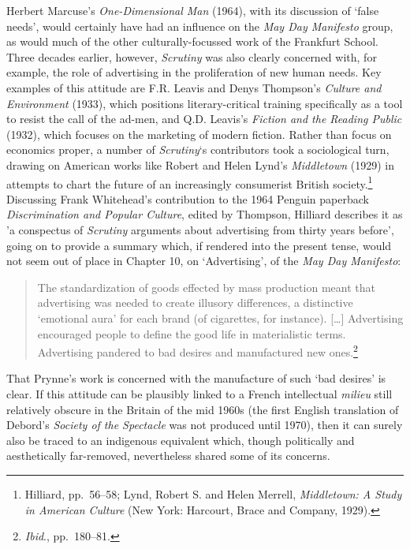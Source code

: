 \documentclass[]{article}
\begin{document}
Herbert Marcuse’s \emph{One-Dimensional Man} (1964), with its discussion
of ‘false needs’, would certainly have had an influence on the \emph{May
Day Manifesto} group, as would much of the other culturally-focussed
work of the Frankfurt School. Three decades earlier, however,
\emph{Scrutiny} was also clearly concerned with, for example, the role
of advertising in the proliferation of new human needs. Key examples of
this attitude are F.R. Leavis and Denys Thompson’s \emph{Culture and
Environment} (1933), which positions literary-critical training
specifically as a tool to resist the call of the ad-men, and Q.D.
Leavis’s \emph{Fiction and the Reading Public} (1932), which focuses on
the marketing of modern fiction. Rather than focus on economics proper,
a number of \emph{Scrutiny}‘s contributors took a sociological turn,
drawing on American works like Robert and Helen Lynd’s \emph{Middletown}
(1929) in attempts to chart the future of an increasingly consumerist
British society.\footnote{Hilliard, pp.~56–58; Lynd, Robert S. and Helen
  Merrell, \emph{Middletown: A Study in American Culture} (New York:
  Harcourt, Brace and Company, 1929).} Discussing Frank Whitehead’s
contribution to the 1964 Penguin paperback \emph{Discrimination and
Popular Culture}, edited by Thompson, Hilliard describes it as ’a
conspectus of \emph{Scrutiny} arguments about advertising from thirty
years before’, going on to provide a summary which, if rendered into the
present tense, would not seem out of place in Chapter 10, on
‘Advertising’, of the \emph{May Day Manifesto}:

\begin{quote}
\singlespacing The standardization of goods effected by mass production
meant that advertising was needed to create illusory differences, a
distinctive ‘emotional aura’ for each brand (of cigarettes, for
instance). {[}\ldots{}{]} Advertising encouraged people to define the
good life in materialistic terms. Advertising pandered to bad desires
and manufactured new ones.\footnote{\emph{Ibid}., pp.~180–81.}
\end{quote}

\noindent That Prynne’s work is concerned with the manufacture of such
‘bad desires’ is clear. If this attitude can be plausibly linked to a
French intellectual \emph{milieu} still relatively obscure in the
Britain of the mid 1960s (the first English translation of Debord’s
\emph{Society of the Spectacle} was not produced until 1970), then it
can surely also be traced to an indigenous equivalent which, though
politically and aesthetically far-removed, nevertheless shared some of
its concerns.
\end{document}
